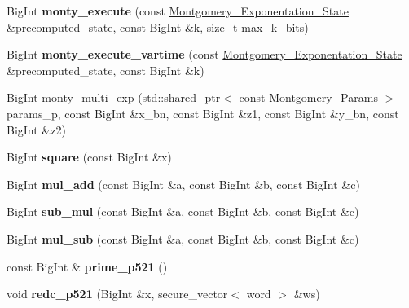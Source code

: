 \begin{DoxyCompactItemize}
\mbox{\label{namespace_botan_ae76236caf2041748af588f6354babd7e}} 
Big\+Int {\bfseries monty\+\_\+execute} (const \mbox{\hyperlink{class_botan_1_1_montgomery___exponentation___state}{Montgomery\+\_\+\+Exponentation\+\_\+\+State}} \&precomputed\+\_\+state, const Big\+Int \&k, size\+\_\+t max\+\_\+k\+\_\+bits)
\item 
\mbox{\label{namespace_botan_acd57171ed4f053774dd31d8c25b7f115}} 
Big\+Int {\bfseries monty\+\_\+execute\+\_\+vartime} (const \mbox{\hyperlink{class_botan_1_1_montgomery___exponentation___state}{Montgomery\+\_\+\+Exponentation\+\_\+\+State}} \&precomputed\+\_\+state, const Big\+Int \&k)
\item 
Big\+Int \mbox{\hyperlink{namespace_botan_a569119add8b600e92227182777726fb1}{monty\+\_\+multi\+\_\+exp}} (std\+::shared\+\_\+ptr$<$ const \mbox{\hyperlink{class_botan_1_1_montgomery___params}{Montgomery\+\_\+\+Params}} $>$ params\+\_\+p, const Big\+Int \&x\+\_\+bn, const Big\+Int \&z1, const Big\+Int \&y\+\_\+bn, const Big\+Int \&z2)
\item 
\mbox{\label{namespace_botan_a3e24e3959f79ce73964bea77ae6e3fa3}} 
Big\+Int {\bfseries square} (const Big\+Int \&x)
\item 
\mbox{\label{namespace_botan_af255ffd065161f14569ceedfc2df37a1}} 
Big\+Int {\bfseries mul\+\_\+add} (const Big\+Int \&a, const Big\+Int \&b, const Big\+Int \&c)
\item 
\mbox{\label{namespace_botan_ad30e7f34834b72d78333fb2c907218d7}} 
Big\+Int {\bfseries sub\+\_\+mul} (const Big\+Int \&a, const Big\+Int \&b, const Big\+Int \&c)
\item 
\mbox{\label{namespace_botan_aaa4827349925501c035bc218b9c5de57}} 
Big\+Int {\bfseries mul\+\_\+sub} (const Big\+Int \&a, const Big\+Int \&b, const Big\+Int \&c)
\item 
\mbox{\label{namespace_botan_ac0e0af50947a9b3e2d43f7edea7b0f12}} 
const Big\+Int \& {\bfseries prime\+\_\+p521} ()
\item 
\mbox{\label{namespace_botan_a08a980d7c9136ea8eb15d775bc907fe0}} 
void {\bfseries redc\+\_\+p521} (Big\+Int \&x, secure\+\_\+vector$<$ word $>$ \&ws)

\end{DoxyCompactItemize}

